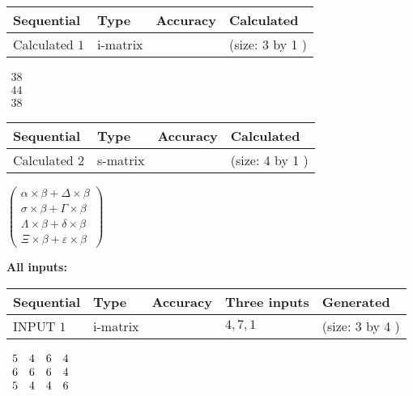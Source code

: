 \documentclass[12pt]{article}
\begin{document}
   
  
  
\noindent\begin{tabular}{|l|l|l|l|}
\hline
 Sequential & Type & Accuracy & Calculated \\ 
\hline
 
 
  Calculated $            1 $ & i-matrix &  & 
 (size:            3  by            1 )
 \\  \hline  
 \end{tabular}
   
   
$\begin{array}{
 c
 }
          38  \\ 
          44  \\ 
          38
 \end{array}  $ 
  
  
\noindent\begin{tabular}{|l|l|l|l|}
\hline
 Sequential & Type & Accuracy & Calculated \\ 
\hline
 
 
  Calculated $            2 $ & s-matrix & & 
 (size:            4  by            1 )
 \\  \hline  
 \end{tabular}
   
   
 $  \left( \begin{array}
 {
 c
 }
  \alpha \times  \beta +  \Delta \times  \beta \\ 
  \sigma \times  \beta +  \Gamma \times  \beta \\ 
  \Lambda \times  \beta +  \delta \times  \beta \\ 
                     \Xi \times  \beta +  \varepsilon \times  \beta
 \end{array} \right) $ 
   
   
\noindent\vspace{0.1in}\hspace{-0.08in} {\textbf{\Large{All inputs: }}}
   
   
  
  
\noindent\begin{tabular}{|l|l|l|l|l|}
\hline
 Sequential & Type & Accuracy & Three inputs & Generated \\ 
\hline
 
 
  INPUT $            1 $ & i-matrix &  & $
 4
 , 
 7
 , 
 1
 $ & (size:            3  by            4 )
 \\  \hline  
 \end{tabular}
   
   
 $\begin{array}{
 c
 c
 c
 c
 }
           5  & 
           4  & 
           6  & 
           4  \\ 
           6  & 
           6  & 
           6  & 
           4  \\ 
           5  & 
           4  & 
           4  & 
           6
\end{array}  $ 
  
\end{document}
